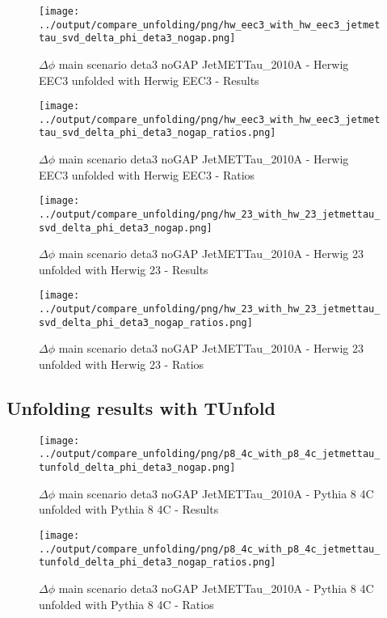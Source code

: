 \documentclass[11pt]{book}
\begin{document}
\begin{figure}[ht]
\centering
\texttt{[image: ../output/compare\_unfolding/png/hw\_eec3\_with\_hw\_eec3\_jetmettau\_svd\_delta\_phi\_deta3\_nogap.png]}
\caption{$\Delta\phi$ main scenario deta3 noGAP JetMETTau\_2010A - Herwig EEC3 unfolded with Herwig EEC3 - Results}
\label{hw_eec3_hw_eec3_jetmettau_svd_delta_phi_deta3_nogap_a}
\end{figure}

\begin{figure}[ht]
\centering
\texttt{[image: ../output/compare\_unfolding/png/hw\_eec3\_with\_hw\_eec3\_jetmettau\_svd\_delta\_phi\_deta3\_nogap\_ratios.png]}
\caption{$\Delta\phi$ main scenario deta3 noGAP JetMETTau\_2010A - Herwig EEC3 unfolded with Herwig EEC3 - Ratios}
\label{hw_eec3_hw_eec3_jetmettau_svd_delta_phi_deta3_nogap_b}
\end{figure}

\begin{figure}[ht]
\centering
\texttt{[image: ../output/compare\_unfolding/png/hw\_23\_with\_hw\_23\_jetmettau\_svd\_delta\_phi\_deta3\_nogap.png]}
\caption{$\Delta\phi$ main scenario deta3 noGAP JetMETTau\_2010A - Herwig 23 unfolded with Herwig 23 - Results}
\label{hw_23_hw_23_jetmettau_svd_delta_phi_deta3_nogap_a}
\end{figure}

\begin{figure}[ht]
\centering
\texttt{[image: ../output/compare\_unfolding/png/hw\_23\_with\_hw\_23\_jetmettau\_svd\_delta\_phi\_deta3\_nogap\_ratios.png]}
\caption{$\Delta\phi$ main scenario deta3 noGAP JetMETTau\_2010A - Herwig 23 unfolded with Herwig 23 - Ratios}
\label{hw_23_hw_23_jetmettau_svd_delta_phi_deta3_nogap_b}
\end{figure}


\clearpage
\subsection{Unfolding results with TUnfold}

\begin{figure}[ht]
\centering
\texttt{[image: ../output/compare\_unfolding/png/p8\_4c\_with\_p8\_4c\_jetmettau\_tunfold\_delta\_phi\_deta3\_nogap.png]}
\caption{$\Delta\phi$ main scenario deta3 noGAP JetMETTau\_2010A - Pythia 8 4C unfolded with Pythia 8 4C - Results}
\label{p8_p8_jetmettau_tunfold_delta_phi_deta3_nogap_a}
\end{figure}

\begin{figure}[ht]
\centering
\texttt{[image: ../output/compare\_unfolding/png/p8\_4c\_with\_p8\_4c\_jetmettau\_tunfold\_delta\_phi\_deta3\_nogap\_ratios.png]}
\caption{$\Delta\phi$ main scenario deta3 noGAP JetMETTau\_2010A - Pythia 8 4C unfolded with Pythia 8 4C - Ratios}
\label{p8_p8_jetmettau_tunfold_delta_phi_deta3_nogap_b}
\end{figure}
\end{document}
